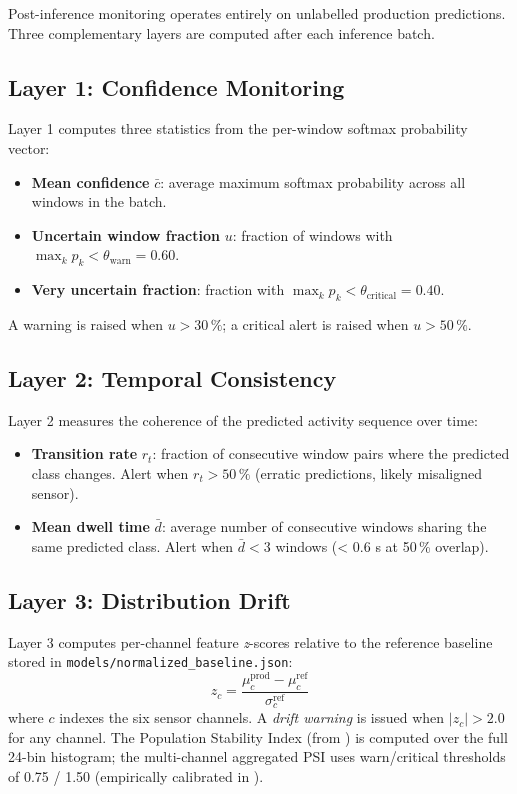 Post-inference monitoring operates entirely on unlabelled production
predictions.
Three complementary layers are computed after each inference batch.

\subsection{Layer 1: Confidence Monitoring}

Layer 1 computes three statistics from the per-window softmax probability vector:
\begin{itemize}
  \item \textbf{Mean confidence} $\bar{c}$: average maximum softmax probability
        across all windows in the batch.
  \item \textbf{Uncertain window fraction} $u$: fraction of windows with
        $\max_k p_k < \theta_{\text{warn}} = 0.60$.
  \item \textbf{Very uncertain fraction}: fraction with
        $\max_k p_k < \theta_{\text{critical}} = 0.40$.
\end{itemize}
A warning is raised when $u > 30\,\%$; a critical alert is raised when
$u > 50\,\%$.

\subsection{Layer 2: Temporal Consistency}

Layer 2 measures the coherence of the predicted activity sequence over time:
\begin{itemize}
  \item \textbf{Transition rate} $r_t$: fraction of consecutive window pairs
        where the predicted class changes.
        Alert when $r_t > 50\,\%$ (erratic predictions, likely misaligned sensor).
  \item \textbf{Mean dwell time} $\bar{d}$: average number of consecutive
        windows sharing the same predicted class.
        Alert when $\bar{d} < 3$ windows (< 0.6 s at 50\,\% overlap).
\end{itemize}

\subsection{Layer 3: Distribution Drift}

Layer 3 computes per-channel feature \textit{z}-scores relative to the
reference baseline stored in \texttt{models/normalized\_baseline.json}:
\begin{equation}
  z_c = \frac{\mu_c^{\text{prod}} - \mu_c^{\text{ref}}}
             {\sigma_c^{\text{ref}}}
\end{equation}
where $c$ indexes the six sensor channels.
A \textit{drift warning} is issued when $|z_c| > 2.0$ for any channel.
The Population Stability Index (from ) is computed over the full
24-bin histogram; the multi-channel aggregated PSI uses warn/critical thresholds
of 0.75 / 1.50 (empirically calibrated in ).

